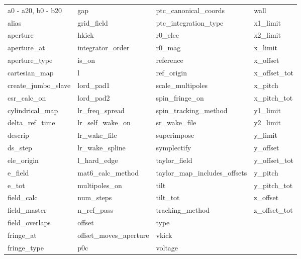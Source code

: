  \begin{tabular}{llll} \toprule
a0 - a20, b0 - b20          & gap                         & ptc_canonical_coords        & wall                        \\
alias                       & grid_field                  & ptc_integration_type        & x1_limit                    \\
aperture                    & hkick                       & r0_elec                     & x2_limit                    \\
aperture_at                 & integrator_order            & r0_mag                      & x_limit                     \\
aperture_type               & is_on                       & reference                   & x_offset                    \\
cartesian_map               & l                           & ref_origin                  & x_offset_tot                \\
create_jumbo_slave          & lord_pad1                   & scale_multipoles            & x_pitch                     \\
csr_calc_on                 & lord_pad2                   & spin_fringe_on              & x_pitch_tot                 \\
cylindrical_map             & lr_freq_spread              & spin_tracking_method        & y1_limit                    \\
delta_ref_time              & lr_self_wake_on             & sr_wake_file                & y2_limit                    \\
descrip                     & lr_wake_file                & superimpose                 & y_limit                     \\
ds_step                     & lr_wake_spline              & symplectify                 & y_offset                    \\
ele_origin                  & l_hard_edge                 & taylor_field                & y_offset_tot                \\
e_field                     & mat6_calc_method            & taylor_map_includes_offsets & y_pitch                     \\
e_tot                       & multipoles_on               & tilt                        & y_pitch_tot                 \\
field_calc                  & num_steps                   & tilt_tot                    & z_offset                    \\
field_master                & n_ref_pass                  & tracking_method             & z_offset_tot                \\
field_overlaps              & offset                      & type                        &                             \\
fringe_at                   & offset_moves_aperture       & vkick                       &                             \\
fringe_type                 & p0c                         & voltage                     &                             \\
 \bottomrule
 \end{tabular}
